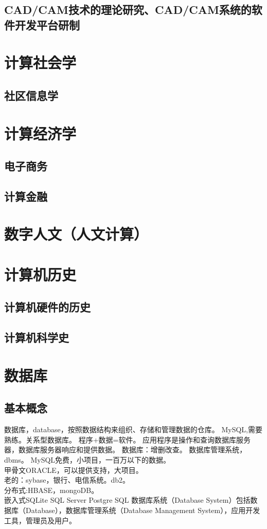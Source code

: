 \documentclass[UTF8]{../computerUniverse}
\begin{document}
\section{CAD/CAM技术的理论研究、CAD/CAM系统的软件开发平台研制}


\chapter{计算社会学}
\section{社区信息学}

\chapter{计算经济学}
\section{电子商务}
\section{计算金融}


\chapter{数字人文（人文计算）}

\chapter{计算机历史}
\section{计算机硬件的历史}
\section{计算机科学史}



\chapter{数据库}

\section{基本概念}
数据库，database，按照数据结构来组织、存储和管理数据的仓库。
MySQL,需要熟练。关系型数据库。
程序+数据=软件。
应用程序是操作和查询数据库服务器，数据库服务器响应和提供数据。
数据库：增删改查。
数据库管理系统，dbms。
MySQL免费，小项目，一百万以下的数据。\\
甲骨文ORACLE，可以提供支持，大项目。\\
老的：sybase，银行、电信系统。db2。\\
分布式:HBASE，mongoDB。\\
嵌入式SQLite
SQL Server
Postgre SQL
数据库系统（Database System）包括数据库（Database），数据库管理系统（Database Management System），应用开发工具，管理员及用户。
\end{document}

